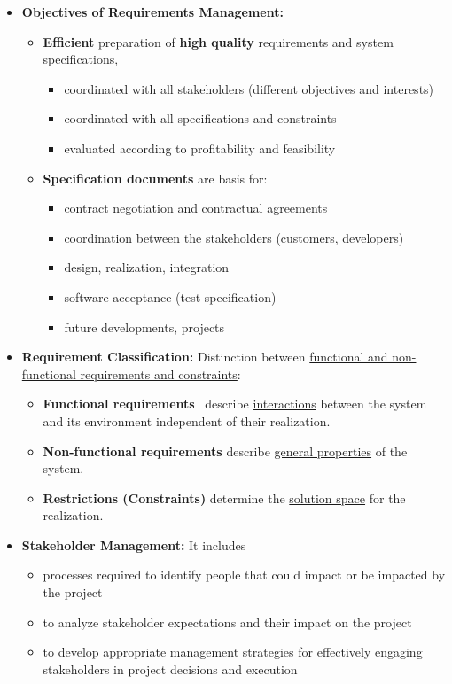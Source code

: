 \documentclass[ieeetran]{article}
\begin{document}
\begin{itemize}
	\item \textbf{Objectives of Requirements Management:}
		\begin{itemize}
		  \item \textbf{Efficient} preparation of \textbf{high quality} requirements and system specifications,
			   \begin{itemize}
			     \item coordinated with all stakeholders (different objectives and interests)
			\item coordinated with all specifications and constraints
			\item evaluated according to profitability and feasibility 
			   \end{itemize}

		\item \textbf{Specification documents} are basis for:
			\begin{itemize}
			  \item contract negotiation and contractual agreements
		\item coordination between the stakeholders (customers, developers)
		\item design, realization, integration
			 \item software acceptance (test specification)
			\item future developments, projects
			\end{itemize}
		\end{itemize}
\item \textbf{Requirement Classification:} Distinction between \underline{functional and non-} \underline{functional requirements and constraints}:
	\begin{itemize}
		\item \textbf{Functional requirements} \ describe \underline{interactions} between the system and its environment independent of their realization.
		\item \textbf{Non-functional requirements} describe \underline{general properties} of the system.
\item \textbf{Restrictions (Constraints)} determine the \underline{solution space} for the realization.	
	\end{itemize}

\item \textbf{Stakeholder Management:} It includes
	\begin{itemize}
	  \item processes required to identify people that could impact or be impacted by the project
\item to analyze stakeholder expectations and their impact on the project
	\item to develop appropriate management strategies for effectively engaging stakeholders in project decisions and execution
	\end{itemize}


\end{itemize}
\end{document}
